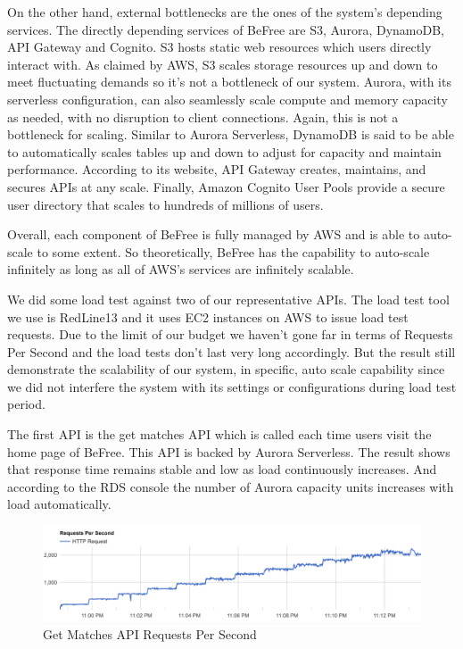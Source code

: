 \documentclass[conference]{IEEEtran}
\begin{document}
On the other hand, external bottlenecks are the ones of the system's depending services. The directly depending services of BeFree are S3, Aurora, DynamoDB, API Gateway and Cognito. S3 hosts static web resources which users directly interact with. As claimed by AWS, S3 scales storage resources up and down to meet fluctuating demands so it's not a bottleneck of our system. Aurora, with its serverless configuration, can also seamlessly scale compute and memory capacity as needed, with no disruption to client connections. Again, this is not a bottleneck for scaling. Similar to Aurora Serverless, DynamoDB is said to be able to automatically scales tables up and down to adjust for capacity and maintain performance. According to its website, API Gateway creates, maintains, and secures APIs at any scale. Finally, Amazon Cognito User Pools provide a secure user directory that scales to hundreds of millions of users.

Overall, each component of BeFree is fully managed by AWS and is able to auto-scale to some extent. So theoretically, BeFree has the capability to auto-scale infinitely as long as all of AWS's services are infinitely scalable.

We did some load test against two of our representative APIs. The load test tool we use is RedLine13 \cite{b19} and it uses EC2 instances on AWS to issue load test requests. Due to the limit of our budget we haven't gone far in terms of Requests Per Second and the load tests don't last very long accordingly. But the result still demonstrate the scalability of our system, in specific, auto scale capability since we did not interfere the system with its settings or configurations during load test period.

The first API is the get matches API which is called each time users visit the home page of BeFree. This API is backed by Aurora Serverless. The result shows that response time remains stable and low as load continuously increases. And according to the RDS console the number of Aurora capacity units increases with load automatically.

\begin{figure}[htbp]
 \centerline{\includegraphics[scale=0.26]{matches-qps.png}}
\caption{Get Matches API Requests Per Second}
\end{figure}
\end{document}
